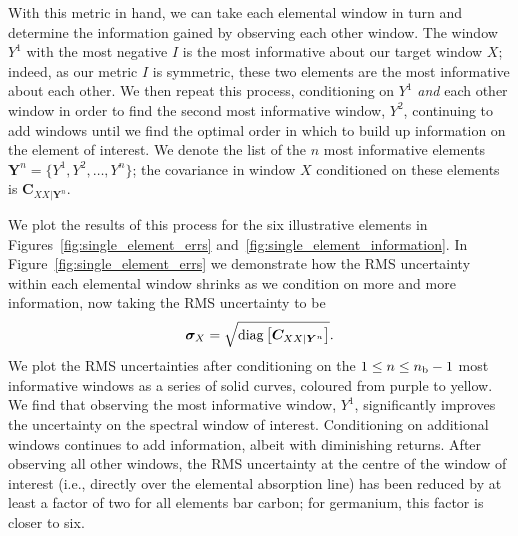 \documentclass[a4paper,fleqn,usenatbib]{mnras}
\newcommand{\nb}{n_{\rm b}}
\newcommand{\condcov}{{\bm C}}
\begin{document}
With this metric in hand, we can take each elemental window in turn and determine the information gained by observing each other window. The window $Y^1$ with the most negative $I$ is the most informative about our target window $X$; indeed, as our metric $I$ is symmetric, these two elements are the most informative about each other. We then repeat this process, conditioning on $Y^1$ {\it and} each other window in order to find the second most informative window, $Y^2$, continuing to add windows until we find the optimal order in which to build up information on the element of interest. We denote the list of the $n$ most informative elements $\bm{Y}^n = \{ Y^1, Y^2, \ldots, Y^n \}$; the covariance in window $X$ conditioned on these elements is $\condcov_{XX|\bm{Y}^n}$.

We plot the results of this process for the six illustrative elements in Figures~\ref{fig:single_element_errs} and~\ref{fig:single_element_information}. In Figure~\ref{fig:single_element_errs} we demonstrate how the RMS uncertainty within each elemental window shrinks as we condition on more and more information, now taking the RMS uncertainty to be
\begin{equation}
\bm{\sigma}_X = \sqrt{{\rm diag} \left[\condcov_{XX|\bm{Y}^n}\right]}.
\end{equation}
We plot the RMS uncertainties after conditioning on the $1 \le n \le \nb-1$ most informative windows as a series of solid curves, coloured from purple to yellow. We find that observing the most informative window, $Y^1$, significantly improves the uncertainty on the spectral window of interest. Conditioning on additional windows continues to add information, albeit with diminishing returns. After observing all other windows, the RMS uncertainty at the centre of the window of interest (i.e., directly over the elemental absorption line) has been reduced by at least a factor of two for all elements bar carbon; for germanium, this factor is closer to six.
\end{document}
